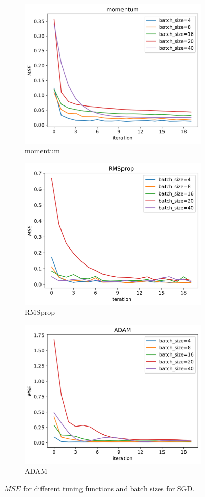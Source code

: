 \documentclass[11pt]{article}
\begin{document}
\begin{figure}[H]
\begin{subfigure}{.5\textwidth}
        \includegraphics[width=.9\textwidth]{../figures/SGD_batch_size_momentum.png}
        \caption{momentum}
        \label{fig:}
    \end{subfigure}
    \begin{subfigure}{.5\textwidth}
        \centering
        \includegraphics[width=.9\textwidth]{../figures/SGD_batch_size_RMSprop.png}
        \caption{RMSprop}
        \label{fig:}
    \end{subfigure}
    \begin{subfigure}{.9\textwidth}
        \centering
        \includegraphics[width=.5\textwidth]{../figures/SGD_batch_size_ADAM.png}
        \caption{ADAM}
        \label{fig:}
    \end{subfigure}
    \caption{$MSE$ for different tuning functions and batch sizes for SGD.}
    \label{fig:compare_batch_size}
\end{figure}
\end{document}
